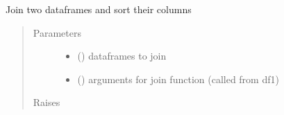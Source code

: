 \documentclass[letterpaper,10pt,english]{sphinxmanual}
\begin{document}
\begin{fulllineitems}
\label{\detokenize{dalio.util:dalio.util.mi_join}}
Join two dataframes and sort their columns
\begin{quote}\begin{description}
\item[{Parameters}] \leavevmode\begin{itemize}
\item {} 
 (\sphinxstyleliteralemphasis{\sphinxupquote{,}}) \textendash{} dataframes to join

\item {} 
 (\sphinxstyleliteralemphasis{\sphinxupquote{,}}) \textendash{} 
arguments for join function (called from df1)


\end{itemize}

\item[{Raises}] \leavevmode
{} \textendash{} 

\end{description}\end{quote}

\end{fulllineitems}

\end{document}
